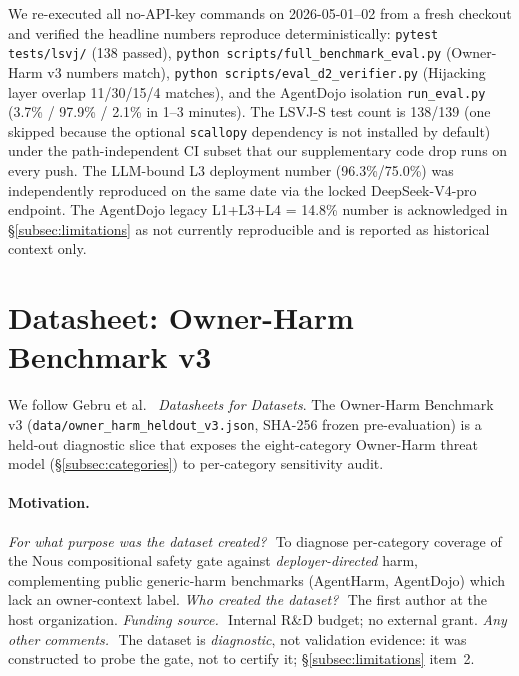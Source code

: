 \documentclass{article}
\theoremstyle{definition}
\begin{document}
We re-executed all no-API-key commands on 2026-05-01--02 from a fresh
checkout and verified the headline numbers reproduce
deterministically: \texttt{pytest tests/lsvj/} (138 passed),
\texttt{python scripts/full\_benchmark\_eval.py} (Owner-Harm v3 numbers
match), \texttt{python scripts/eval\_d2\_verifier.py} (Hijacking layer
overlap 11/30/15/4 matches), and the AgentDojo isolation
\texttt{run\_eval.py} (3.7\% / 97.9\% / 2.1\% in 1--3 minutes). The LSVJ-S test count is 138/139 (one skipped
because the optional \texttt{scallopy} dependency is not installed by
default) under the path-independent CI subset that our supplementary
code drop runs on every push. The LLM-bound L3 deployment number
(96.3\%/75.0\%) was independently reproduced on the same date via the
locked DeepSeek-V4-pro endpoint. The AgentDojo legacy L1+L3+L4 = 14.8\%
number is acknowledged in \S\ref{subsec:limitations} as not currently
reproducible and is reported as historical context only.

\section{Datasheet: Owner-Harm Benchmark v3}
\label{app:datasheet}

We follow Gebru et al.\ \cite{gebru2021datasheets} \emph{Datasheets for
Datasets}. The Owner-Harm Benchmark v3 (\texttt{data/owner\_harm\_heldout\_v3.json},
SHA-256 frozen pre-evaluation) is a held-out diagnostic slice that
exposes the eight-category Owner-Harm threat model
(\S\ref{subsec:categories}) to per-category sensitivity audit.

\paragraph{Motivation.}
\textit{For what purpose was the dataset created?}\ \,To diagnose
per-category coverage of the Nous compositional safety gate against
\emph{deployer-directed} harm, complementing public generic-harm
benchmarks (AgentHarm, AgentDojo) which lack an owner-context label.
\textit{Who created the dataset?}\ \,The first author at the host
organization. \textit{Funding source.}\ \,Internal R\&D budget; no
external grant. \textit{Any other comments.}\ \,The dataset is
\emph{diagnostic}, not validation evidence: it was constructed to
probe the gate, not to certify it; \S\ref{subsec:limitations} item~2.
\end{document}
